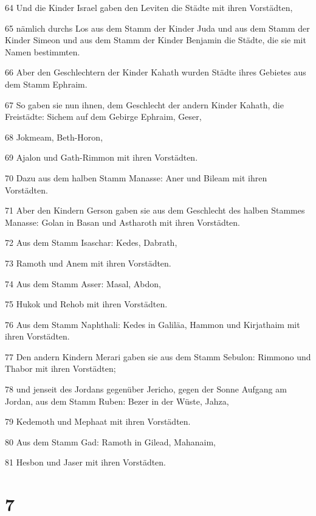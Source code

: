 \par 64 Und die Kinder Israel gaben den Leviten die Städte mit ihren Vorstädten,
\par 65 nämlich durchs Los aus dem Stamm der Kinder Juda und aus dem Stamm der Kinder Simeon und aus dem Stamm der Kinder Benjamin die Städte, die sie mit Namen bestimmten.
\par 66 Aber den Geschlechtern der Kinder Kahath wurden Städte ihres Gebietes aus dem Stamm Ephraim.
\par 67 So gaben sie nun ihnen, dem Geschlecht der andern Kinder Kahath, die Freistädte: Sichem auf dem Gebirge Ephraim, Geser,
\par 68 Jokmeam, Beth-Horon,
\par 69 Ajalon und Gath-Rimmon mit ihren Vorstädten.
\par 70 Dazu aus dem halben Stamm Manasse: Aner und Bileam mit ihren Vorstädten.
\par 71 Aber den Kindern Gerson gaben sie aus dem Geschlecht des halben Stammes Manasse: Golan in Basan und Astharoth mit ihren Vorstädten.
\par 72 Aus dem Stamm Isaschar: Kedes, Dabrath,
\par 73 Ramoth und Anem mit ihren Vorstädten.
\par 74 Aus dem Stamm Asser: Masal, Abdon,
\par 75 Hukok und Rehob mit ihren Vorstädten.
\par 76 Aus dem Stamm Naphthali: Kedes in Galiläa, Hammon und Kirjathaim mit ihren Vorstädten.
\par 77 Den andern Kindern Merari gaben sie aus dem Stamm Sebulon: Rimmono und Thabor mit ihren Vorstädten;
\par 78 und jenseit des Jordans gegenüber Jericho, gegen der Sonne Aufgang am Jordan, aus dem Stamm Ruben: Bezer in der Wüste, Jahza,
\par 79 Kedemoth und Mephaat mit ihren Vorstädten.
\par 80 Aus dem Stamm Gad: Ramoth in Gilead, Mahanaim,
\par 81 Hesbon und Jaser mit ihren Vorstädten.

\chapter{7}

